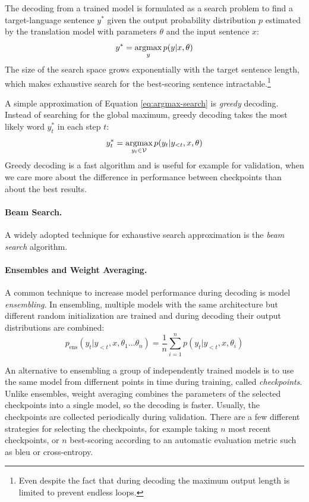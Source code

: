 The decoding from a trained model is formulated as a search problem to find a
target-language sentence $y^*$ given the output probability distribution $p$
estimated by the translation model with parameters $\theta$ and the input
sentence $x$:
%
\begin{equation}
  y^* = \operatorname*{argmax}_{y} p(y|x, \theta)
  \label{eq:argmax-search}
\end{equation}
%
The size of the search space grows exponentially with the target sentence
length, which makes exhaustive search for the best-scoring sentence
intractable.\footnote{Even despite the fact that during decoding the maximum
  output length is limited to prevent endless loops.}

A simple approximation of Equation \ref{eq:argmax-search} is \emph{greedy}
decoding. Instead of searching for the global maximum, greedy decoding takes
the most likely word $y_t^*$ in each step $t$:
%
\begin{equation}
  y_t^* = \operatorname*{argmax}_{y_t \in \mathcal{V}} p(y_t | y_{<t}, x, \theta)
  \label{eq:greedy-decoding}
\end{equation}
%
Greedy decoding is a fast algorithm and is useful for example for validation,
when we care more about the difference in performance between checkpoints than
about the best results.

\paragraph{Beam Search.}
A widely adopted technique for exhaustive search approximation is the
\emph{beam search} algorithm. 

\paragraph{Ensembles and Weight Averaging.} A common technique to increase
model performance during decoding is model \emph{ensembling}. In ensembling,
multiple models with the same architecture but different random initialization
are trained and during decoding their output distributions are combined:
%
\begin{equation}
  p_{\text{ens}}(y_t | y_{<t}, x, \theta_1 \ldots \theta_n) =
  \frac{1}{n} \sum_{i=1}^n p(y_t | y_{<t}, x, \theta_i)
\end{equation}

An alternative to ensembling a group of independently trained models is to use
the same model from differnent points in time during training, called
\emph{checkpoints}. Unlike ensembles, weight averaging combines the parameters
of the selected checkpoints into a single model, so the decoding is faster.
Usually, the checkpoints are collected periodically during validation. There
are a few different strategies for selecting the checkpoints, for example
taking $n$ most recent checkpoints, or $n$ best-scoring according to an
automatic evaluation metric such as \acs{bleu} or cross-entropy.

